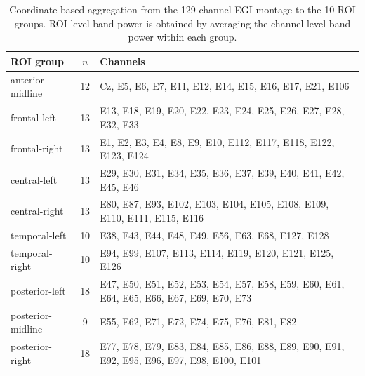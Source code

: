 \begin{table}[!t]
\centering
\scriptsize
\caption{Coordinate-based aggregation from the 129-channel EGI montage to the 10 ROI groups. ROI-level band power is obtained by averaging the channel-level band power within each group.}
\label{tab:realdata-roi}
\renewcommand{\arraystretch}{1.05}
\begin{tabular}{@{}lcp{}@{}}
\toprule
ROI group & $n$ & Channels \\
\midrule
anterior-midline & 12 & Cz, E5, E6, E7, E11, E12, E14, E15, E16, E17, E21, E106 \\
frontal-left & 13 & E13, E18, E19, E20, E22, E23, E24, E25, E26, E27, E28, E32, E33 \\
frontal-right & 13 & E1, E2, E3, E4, E8, E9, E10, E112, E117, E118, E122, E123, E124 \\
central-left & 13 & E29, E30, E31, E34, E35, E36, E37, E39, E40, E41, E42, E45, E46 \\
central-right & 13 & E80, E87, E93, E102, E103, E104, E105, E108, E109, E110, E111, E115, E116 \\
temporal-left & 10 & E38, E43, E44, E48, E49, E56, E63, E68, E127, E128 \\
temporal-right & 10 & E94, E99, E107, E113, E114, E119, E120, E121, E125, E126 \\
posterior-left & 18 & E47, E50, E51, E52, E53, E54, E57, E58, E59, E60, E61, E64, E65, E66, E67, E69, E70, E73 \\
posterior-midline & 9 & E55, E62, E71, E72, E74, E75, E76, E81, E82 \\
posterior-right & 18 & E77, E78, E79, E83, E84, E85, E86, E88, E89, E90, E91, E92, E95, E96, E97, E98, E100, E101 \\
\bottomrule
\end{tabular}
\end{table}
